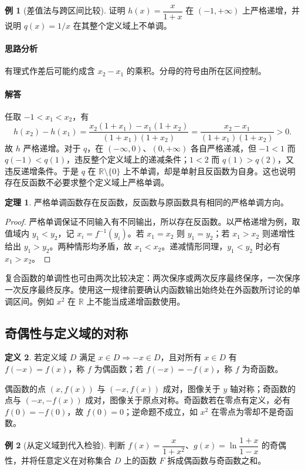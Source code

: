 \documentclass[UTF8,fontset=fandol,12pt,oneside,openany]{ctexrep}
\newcommand{\R}{\mathbb R}
\theoremstyle{definition}
\newtheorem{theorem}{定理}[chapter]
\newtheorem{definition}[theorem]{定义}
\newtheorem{example}{例}[chapter]
\begin{document}
\begin{example}[差值法与跨区间比较]
证明 $h(x)=\dfrac{x}{1+x}$ 在 $(-1,+\infty)$ 上严格递增，并说明 $q(x)=1/x$ 在其整个定义域上不单调。
\end{example}
\paragraph{思路分析} 有理式作差后可能约成含 $x_2-x_1$ 的乘积。分母的符号由所在区间控制。
\paragraph{解答} 任取 $-1<x_1<x_2$，有
\[
 h(x_2)-h(x_1)=\frac{x_2(1+x_1)-x_1(1+x_2)}{(1+x_1)(1+x_2)}
 =\frac{x_2-x_1}{(1+x_1)(1+x_2)}>0.
\]
故 $h$ 严格递增。对于 $q$，在 $(-\infty,0)$、$(0,+\infty)$ 各自严格递减，但 $-1<1$ 而 $q(-1)<q(1)$，违反整个定义域上的递减条件；$1<2$ 而 $q(1)>q(2)$，又违反递增条件。于是 $q$ 在 $\R\setminus\{0\}$ 上不单调，却是单射且反函数为自身。这也说明存在反函数不必要求整个定义域上严格单调。

\begin{theorem}
严格单调函数存在反函数，反函数与原函数具有相同的严格单调方向。
\end{theorem}
\begin{proof}
严格单调保证不同输入有不同输出，所以存在反函数。以严格递增为例，取值域内 $y_1<y_2$，记 $x_i=f^{-1}(y_i)$。若 $x_1=x_2$ 则 $y_1=y_2$；若 $x_1>x_2$ 则递增性给出 $y_1>y_2$。两种情形均矛盾，故 $x_1<x_2$。递减情形同理，$y_1<y_2$ 时必有 $x_1>x_2$。
\end{proof}
复合函数的单调性也可由两次比较决定：两次保序或两次反序最终保序，一次保序一次反序最终反序。使用这一规律前要确认内函数输出始终处在外函数所讨论的单调区间。例如 $x^2$ 在 $\R$ 上不能当成递增函数使用。

\subsection{奇偶性与定义域的对称}
\begin{definition}
若定义域 $D$ 满足 $x\in D\Rightarrow -x\in D$，且对所有 $x\in D$ 有 $f(-x)=f(x)$，称 $f$ 为偶函数；若 $f(-x)=-f(x)$，称 $f$ 为奇函数。
\end{definition}
偶函数的点 $(x,f(x))$ 与 $(-x,f(x))$ 成对，图像关于 $y$ 轴对称；奇函数的点与 $(-x,-f(x))$ 成对，图像关于原点对称。奇函数若在零点有定义，必有 $f(0)=-f(0)$，故 $f(0)=0$；逆命题不成立，如 $x^2$ 在零点为零却不是奇函数。

\begin{example}[从定义域到代入检验]
判断 $f(x)=\dfrac{x}{1+x^2}$、$g(x)=\ln\dfrac{1+x}{1-x}$ 的奇偶性，并将任意定义在对称集合 $D$ 上的函数 $F$ 拆成偶函数与奇函数之和。
\end{example}
\end{document}
